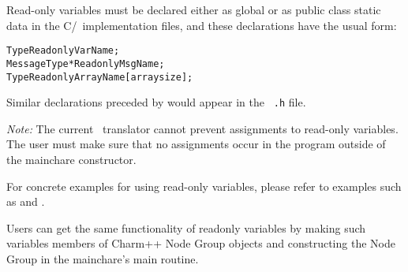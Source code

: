 Read-only variables must be declared either as global or as public class static
data in the C/\CC\ implementation files, and these declarations have the usual
form:

\begin{alltt}
 Type ReadonlyVarName;
 MessageType *ReadonlyMsgName;
 Type ReadonlyArrayName [arraysize];
\end{alltt}

Similar declarations preceded by  would appear in the {\tt
.h} file. 

{\it Note:}  The current \charmpp\ translator cannot prevent
assignments to read-only variables.  The user must make sure that no
assignments occur in the program outside of the mainchare constructor.

For concrete examples for using read-only variables, please refer to examples
such as  and .

Users can get the same functionality of readonly variables by making such variables
members of Charm++ Node Group objects and constructing the Node Group in the mainchare's
main routine.

